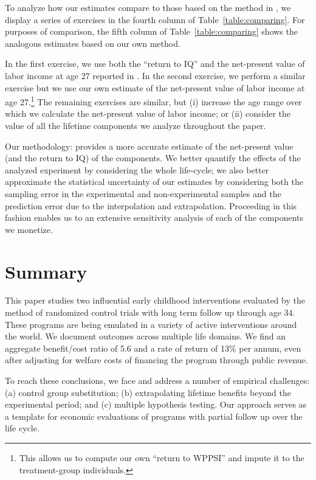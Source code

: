 To analyze how our estimates compare to those based on the method in \citet{Kline_Walters_2016_QJE}, we display a series of exercises in the fourth column of Table~\ref{table:comparing}. For purposes of comparison, the fifth column of Table~\ref{table:comparing} shows the analogous estimates based on our own method.

In the first exercise, we use both the ``return to IQ'' and the net-present value of labor income at age 27 reported in  \citet{Chetty_Friedman_etal_2011_QJoE}. In the second exercise, we perform a similar exercise but we use our own estimate of the net-present value of labor income at age 27.\footnote{This allows us to compute our own ``return to WPPSI'' and impute it to the treatment-group individuals.} The remaining exercises are similar, but (i) increase the age range over which we calculate the net-present value of labor income; or (ii) consider the value of all the lifetime components we analyze throughout the paper.

Our methodology: provides a more accurate estimate of the net-present value (and the return to IQ) of the components. We better quantify the effects of the analyzed experiment by considering the whole life-cycle; we also better approximate the statistical uncertainty of our estimates by considering both the sampling error in the experimental and non-experimental samples and the prediction error due to the interpolation and extrapolation. Proceeding in this fashion enables us to an extensive sensitivity analysis of each of the components we monetize.

\section{Summary} \label{section:conclusion}

This paper studies two influential early childhood interventions evaluated by the method of randomized control trials with long term follow up through age 34. These programs are being emulated in a variety of active interventions around the world. We document outcomes across multiple life domains. We find an aggregate benefit/cost ratio of 5.6 and a rate of return of 13\% per annum, even after adjusting for welfare costs of financing the program through public revenue.

To reach these conclusions, we face and address a number of empirical challenges: (a) control group substitution; (b) extrapolating lifetime benefits beyond the experimental period; and (c) multiple hypothesis testing. Our approach serves as a template for economic evaluations of programs with partial follow up over the life cycle.

